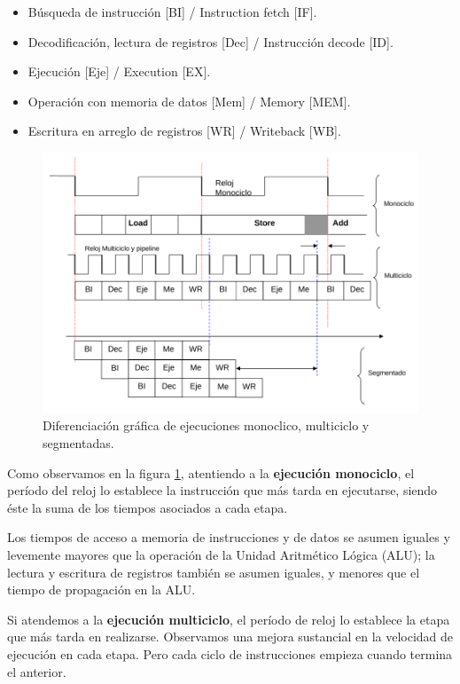 \documentclass[a4paper, 11pt, titlepage]{article}
\begin{document}
    \begin{itemize}
        \item Búsqueda de instrucción [BI] / Instruction fetch [IF].
        \item Decodificación, lectura de registros [Dec] / Instrucción decode [ID].
        \item Ejecución [Eje] / Execution [EX].
        \item Operación con memoria de datos [Mem] / Memory [MEM].
        \item Escritura en arreglo de registros [WR] / Writeback [WB].
    \end{itemize}

    \begin{figure}[htp]
        \centering
        \includegraphics[width=1\textwidth]{resources/pipe00.png}
        \caption{Diferenciación gráfica de ejecuciones monoclico, multiciclo y segmentadas.}
        \label{pipe00}
    \end{figure}

    Como observamos en la figura \ref{pipe00}, atentiendo a la \textbf{ejecución monociclo}, el período del reloj lo establece la 
    instrucción que más tarda en ejecutarse, siendo éste la suma de los tiempos asociados a cada etapa.

    Los tiempos de acceso a memoria de instrucciones y de datos se asumen iguales y levemente mayores que la operación  
    de la Unidad Aritmético Lógica (ALU); la lectura y escritura de registros también se asumen iguales, y menores que el tiempo
    de propagación en la ALU.

    Si atendemos a la \textbf{ejecución multiciclo}, el período de reloj lo establece la etapa que más tarda en realizarse. Observamos 
    una mejora sustancial en la velocidad de ejecución en cada etapa. Pero cada ciclo de instrucciones empieza cuando termina el anterior.
\end{document}
